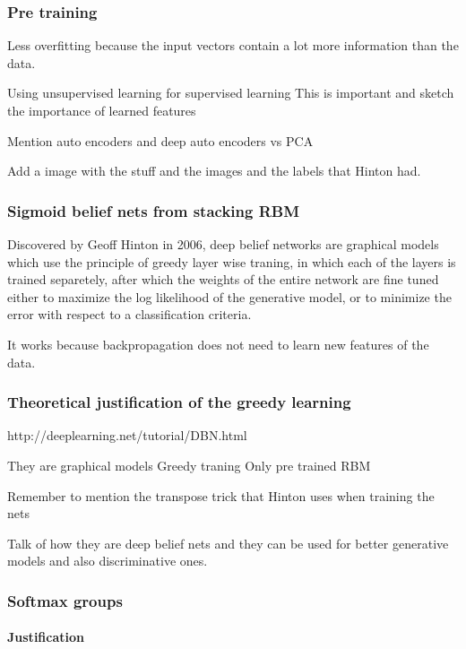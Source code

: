 \documentclass[11pt, fleqn, twoside]{article}
\begin{document}
\subsubsection{Pre training}
  Less overfitting because the input vectors contain a lot more information than the data.

  Using unsupervised learning for supervised learning
  This is important and sketch the importance of learned features

  Mention auto encoders and deep auto encoders vs PCA

  Add a image with the stuff and the images and the labels that Hinton had.


\subsubsection{ Sigmoid belief nets from stacking RBM}
  Discovered by Geoff Hinton in 2006, deep belief networks are graphical models which use the principle of greedy layer wise traning, in which each of the layers is trained separetely, after which the weights of the entire network are fine tuned either to maximize the log likelihood of the generative model, or to minimize the error with respect to a classification criteria.

  It works because backpropagation does not need to learn new features of the data.


\subsubsection {Theoretical justification of the greedy learning}
  http://deeplearning.net/tutorial/DBN.html

  They are graphical models
  Greedy traning
  Only pre trained RBM

  Remember to mention the transpose trick that Hinton uses when training the nets

  Talk of how they are deep belief nets and they can be used for better generative models and also discriminative ones.


\subsubsection {Softmax groups}

\paragraph{Justification}
\end{document}
